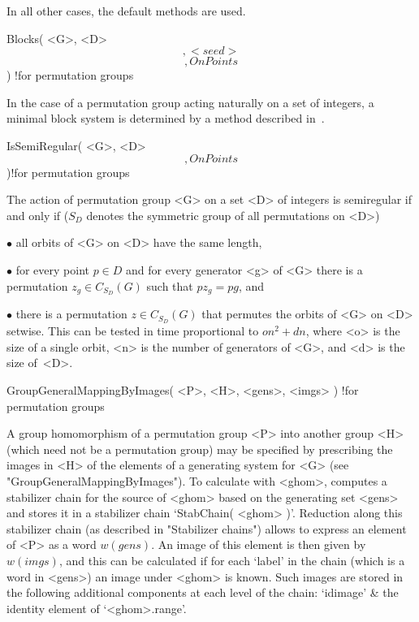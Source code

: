 In all other cases, the default methods are used.

\>Blocks( <G>, <D> \[, <seed> \] \[, OnPoints \] )%
  !{for permutation groups}

In the case of a permutation group acting naturally on a set of integers,
a   minimal  block   system   is   determined  by   a  method   described
in~\cite{SS94}.

\>IsSemiRegular( <G>, <D> \[, OnPoints \] )!{for permutation groups}

The   action of  permutation  group <G>   on  a  set <D> of   integers is
semiregular if  and  only if  ($S_D$ denotes the  symmetric  group of all
permutations on <D>)
\beginlist
  \item{$\bullet$} all orbits of <G> on <D> have the same length,
  \item{$\bullet$}  for every point $p\in D$  and for every generator <g>
    of <G> there  is a permutation  $z_g\in C_{S_D}(G)$ such that $pz_g =
    pg$, and
  \item{$\bullet$} there is a permutation $z\in C_{S_D}(G)$ that permutes
    the orbits of <G> on <D> setwise.
\endlist
This can  be tested in time  proportional to $o n^2 +  d n$, where <o> is
the size of a single  orbit, <n> is the number  of generators of <G>, and
<d> is the size of~<D>.


\>GroupGeneralMappingByImages( <P>, <H>, <gens>, <imgs> )%
  !{for permutation groups}

A group homomorphism  of a permutation group  <P> into  another group <H>
(which need not be  a permutation group)  may be specified by prescribing
the images in <H>  of the elements of  a  generating system for  <G> (see
"GroupGeneralMappingByImages"). To calculate with <ghom>, {\GAP} computes
a stabilizer chain for  the source of <ghom> based  on the generating set
<gens> and  stores it   in  a  stabilizer chain `StabChain(   <ghom>  )'.
Reduction along this stabilizer    chain  (as described  in   "Stabilizer
chains") allows to  express an element  of <P>  as  a word  $w(gens)$. An
image of  this  element  is then given   by  $w(imgs)$, and  this can  be
calculated if for each `label'  in the chain  (which is a word in <gens>)
an image under  <ghom> is known. Such  images are stored in the following
additional components at each level of the chain:
\beginitems
`idimage' &
        the identity element of `<ghom>.range'.


